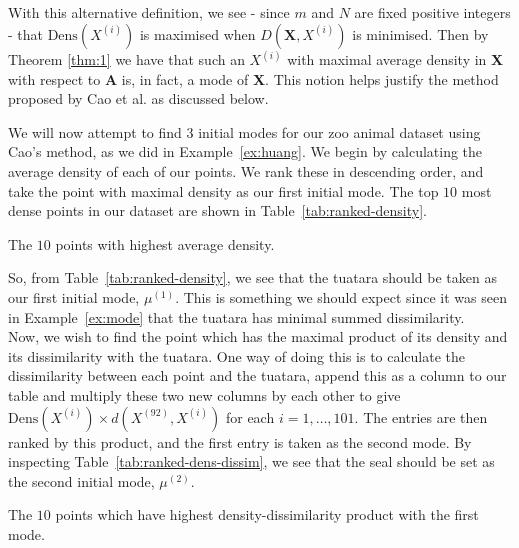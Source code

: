 With this alternative definition, we see - since \(m\) and \(N\) are fixed 
positive integers - that \(\text{Dens}(X^{(i)})\) is maximised when 
\(D(\textbf{X}, X^{(i)})\) is minimised. Then by Theorem \ref{thm:1} we have
that such an \(X^{(i)}\) with maximal average density in \textbf{X} with respect
to \textbf{A} is, in fact, a mode of \textbf{X}. This notion helps justify the 
method proposed by Cao et al. as discussed below.\\



\begin{example}\label{ex:cao}
    We will now attempt to find \(3\) initial modes for our zoo animal dataset 
    using Cao's method, as we did in Example~\ref{ex:huang}. We begin by 
    calculating the average density of each of our points. We rank these in 
    descending order, and take the point with maximal density as our first 
    initial mode. The top \(10\) most dense points in our dataset are shown in
    Table~\ref{tab:ranked-density}.

    \begin{table}[H]
    \resizebox{\textwidth}{!}{%
        
    }
    \caption{The \(10\) points with highest average density.}\label{%
    tab:ranked-density}
    \end{table}

    So, from Table~\ref{tab:ranked-density}, we see that the tuatara should be
    taken as our first initial mode, \(\mu^{(1)}\). This is something we should
    expect since it was seen in Example~\ref{ex:mode} that the tuatara has
    minimal summed dissimilarity.\\
    
    Now, we wish to find the point which has the maximal product of its density
    and its dissimilarity with the tuatara. One way of doing this is to 
    calculate the dissimilarity between each point and the tuatara, append this
    as a column to our table and multiply these two new columns by each other
    to give \(\text{Dens}(X^{(i)}) \times d(X^{(92)}, X^{(i)})\) for each \(i =
    1, \ldots, 101\). The entries are then ranked by this product, and the first
    entry is taken as the second mode. By inspecting 
    Table~\ref{tab:ranked-dens-dissim}, we see that the seal should be set as
    the second initial mode, \(\mu^{(2)}\).\\

    \begin{table}[H]
    \resizebox{\textwidth}{!}{%
        
    }
    \caption{The \(10\) points which have highest density-dissimilarity product
    with the first mode.}\label{tab:ranked-dens-dissim}
    \end{table}


\end{example}
